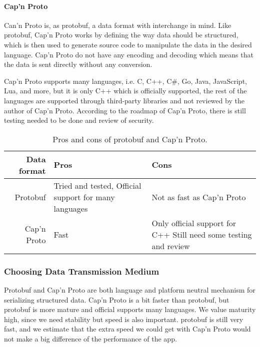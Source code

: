 \paragraph{Cap'n Proto}
Can'n Proto is, as protobuf, a data format with interchange in mind.
Like protobuf, Cap'n Proto works by defining the way data should be structured, which is then used to generate source code to manipulate the data in the desired language\cite{capnproto_schema}.
Cap'n Proto do not have any encoding and decoding which means that the data is sent directly without any conversion\cite{capnproto}.

Cap'n Proto supports many languages, i.e. C, C++, C\#, Go, Java, JavaScript, Lua, and more,
but it is only C++ which is officially supported, 
the rest of the languages are supported through third-party libraries and not reviewed by the author of Cap'n Proto\cite{capnproto_langs}. 
According to the roadmap of Cap'n Proto, there is still testing needed to be done and review of security\cite{capnproto_roadmap}.

\begin{table}
    \setlength{\tabcolsep}{10pt}
    \centering
    \begin{tabularx}{0.9\textwidth}{rXX}\toprule
        Data format & Pros                              & Cons \\\midrule
        Protobuf    & Tried and tested, \newline Official support for many languages & Not as fast as Cap'n Proto \\
        Cap'n Proto & Fast                              & Only official support for C++ \newline Still need some testing and review \\
    \end{tabularx}
    \caption{Pros and cons of protobuf and Cap'n Proto.}\label{tab:format_pros_cons}
\end{table}

\subsubsection{Choosing Data Transmission Medium}
Protobuf and Cap'n Proto are both language and platform neutral mechanism for serializing structured data.
Cap'n Proto is a bit faster than protobuf, but protobuf is more mature and official supports many languages. 
We value maturity high, since we need stability but speed is also important.
protobuf is still very fast, and we estimate that the extra speed we could get with Cap'n Proto would not make a big difference of the performance of the app.


